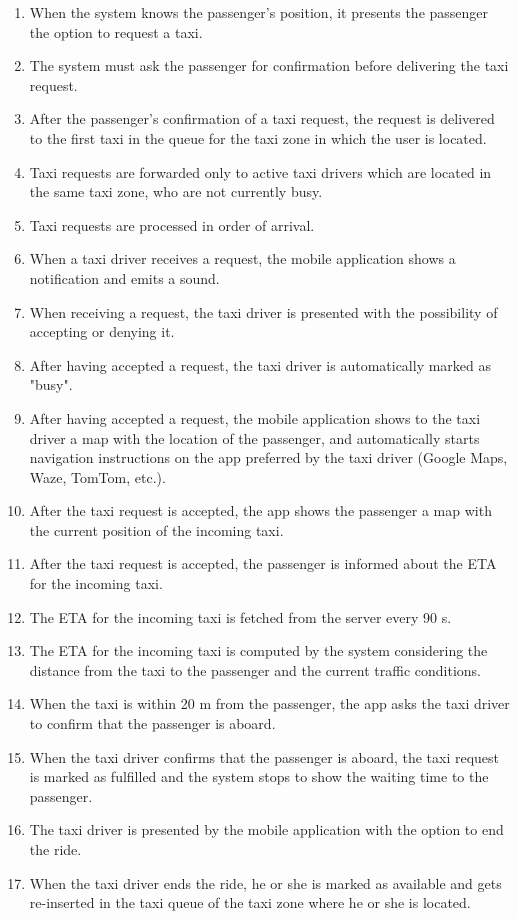 \begin{enumerate}
\item When the system knows the passenger's position, it presents the passenger the option to request a taxi.
\item The system must ask the passenger for confirmation before delivering the taxi request.
\item After the passenger's confirmation of a taxi request, the request is delivered to the first taxi in the queue for the taxi zone in which the user is located.
\item Taxi requests are forwarded only to active taxi drivers which are located in the same taxi zone, who are not currently busy.
\item Taxi requests are processed in order of arrival.
\item When a taxi driver receives a request, the mobile application shows a notification and emits a sound.
\item When receiving a request, the taxi driver is presented with the possibility of accepting or denying it.
\item After having accepted a request, the taxi driver is automatically marked as "busy".
\item After having accepted a request, the mobile application shows to the taxi driver a map with the location of the passenger, and automatically starts navigation instructions on the app preferred by the taxi driver (Google Maps, Waze, TomTom, etc.).
\item After the taxi request is accepted, the app shows the passenger a map with the current position of the incoming taxi.
\item After the taxi request is accepted, the passenger is informed about the ETA for the incoming taxi.
\item The ETA for the incoming taxi is fetched from the server every 90 s.
\item The ETA for the incoming taxi is computed by the system considering the distance from the taxi to the passenger and the current traffic conditions.
\item When the taxi is within 20 m from the passenger, the app asks the taxi driver to confirm that the passenger is aboard.
\item When the taxi driver confirms that the passenger is aboard, the taxi request is marked as fulfilled and the system stops to show the waiting time to the passenger.
\item The taxi driver is presented by the mobile application with the option to end the ride.
\item When the taxi driver ends the ride, he or she is marked as available and gets re-inserted in the taxi queue of the taxi zone where he or she is located.
\end{enumerate}